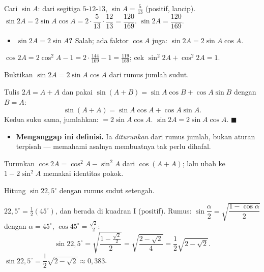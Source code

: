\jawab
{} Cari $\sin A$: dari segitiga $5$-$12$-$13$, $\sin A=\frac{5}{13}$
(positif, lancip).
 $\sin2A=2\sin A\cos A=2\cdot\dfrac{5}{13}\cdot\dfrac{12}{13}
=\dfrac{120}{169}$.
\jadi $\sin2A=\dfrac{120}{169}$.

\begin{jebakan}
\begin{itemize}[leftmargin=*,topsep=2pt]
  \item \textbf{$\sin2A=2\sin A$?} Salah; ada faktor $\cos A$ juga:
  $\sin2A=2\sin A\cos A$.
\end{itemize}
\end{jebakan}

\begin{variasi}
$\cos2A=2\cos^2 A-1=2\cdot\frac{144}{169}-1=\frac{119}{169}$; cek
$\sin^2 2A+\cos^2 2A=1$.
\end{variasi}

\begin{soalbox}{}
Buktikan $\sin2A=2\sin A\cos A$ dari rumus jumlah sudut.
\end{soalbox}

\jawab
{} Tulis $2A=A+A$ dan pakai $\sin(A+B)=\sin A\cos B+\cos A\sin B$
dengan $B=A$:
\[
\sin(A+A)=\sin A\cos A+\cos A\sin A.
\]
 Kedua suku sama, jumlahkan: $=2\sin A\cos A$.
\jadi $\sin2A=2\sin A\cos A$. $\blacksquare$

\begin{jebakan}
\begin{itemize}[leftmargin=*,topsep=2pt]
  \item \textbf{Menganggap ini definisi.} Ia \emph{diturunkan} dari rumus jumlah,
  bukan aturan terpisah --- memahami asalnya membuatnya tak perlu dihafal.
\end{itemize}
\end{jebakan}

\begin{variasi}
Turunkan $\cos2A=\cos^2 A-\sin^2 A$ dari $\cos(A+A)$; lalu ubah ke
$1-2\sin^2 A$ memakai identitas pokok.
\end{variasi}

\begin{soalbox}{}
Hitung $\sin22{,}5^\circ$ dengan rumus sudut setengah.
\end{soalbox}

\jawab
{} $22{,}5^\circ=\tfrac12(45^\circ)$, dan berada di kuadran I (positif).
 Rumus: $\sin\dfrac{\alpha}{2}=\sqrt{\dfrac{1-\cos\alpha}{2}}$ dengan
$\alpha=45^\circ$, $\cos45^\circ=\frac{\sqrt2}{2}$:
\[
\sin22{,}5^\circ=\sqrt{\frac{1-\frac{\sqrt2}{2}}{2}}
=\sqrt{\frac{2-\sqrt2}{4}}=\frac{1}{2}\sqrt{2-\sqrt2}.
\]
\jadi $\sin22{,}5^\circ=\dfrac12\sqrt{2-\sqrt2}\approx0{,}383$.

